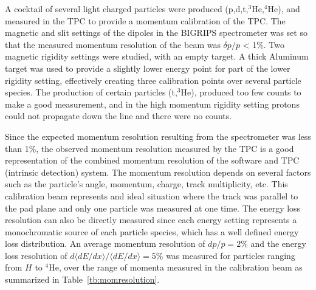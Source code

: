 A cocktail of several light charged particles were produced (p,d,t,${}^{3}$He,${}^{4}$He), and measured in the TPC to provide a momentum calibration of the TPC. The magnetic and slit settings of the dipoles in the BIGRIPS spectrometer was set so that the measured momentum resolution of the beam was $\delta p/p$ < 1\%. Two magnetic rigidity settings were studied, with an empty target. A thick Aluminum target was used to provide a slightly lower energy point for part of the lower rigidity setting, effectively creating three calibration points over several particle species. The production of certain particles (t,${}^{3}$He), produced too few counts to make a good measurement, and in the high momentum rigidity setting protons could not propagate down the line and there were no counts. 

Since the expected momentum resolution resulting from the spectrometer was less than 1\%, the observed momentum resolution measured by the TPC is a good representation of the combined momentum resolution of the software and TPC (intrinsic detection) system. The momentum resolution depends on several factors such as the particle's angle, momentum, charge, track multiplicity, etc. This calibration beam represents and ideal situation where the track was parallel to the pad plane and only one particle was measured at one time. The energy loss resolution can also be directly measured since each energy setting represents a monochromatic source of each particle species, which has a well defined energy loss distribution. An average momentum resolution of $dp/p = 2\%$ and the energy loss resolution of $d\langle dE/dx \rangle/\langle dE/dx \rangle = 5\%$ was measured for particles ranging from $H$ to ${}^{4}$He, over the range of momenta measured in the calibration beam as summarized in Table~\ref{tb:momresolution}.


